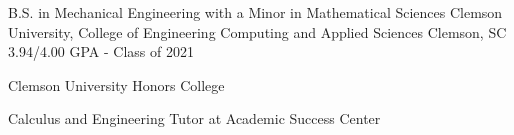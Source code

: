 

\begin{cventries}

  \cventry
    {B.S. in Mechanical Engineering with a Minor in Mathematical Sciences} %
    {Clemson University, College of Engineering Computing and Applied Sciences} %
    {Clemson, SC} %
    {3.94/4.00 GPA - Class of 2021} %
    {   
      \begin{cvitems}%
        \item {Clemson University Honors College}
        \item {Calculus and Engineering Tutor at Academic Success Center} 
      \end{cvitems}
    }

\end{cventries}
    
